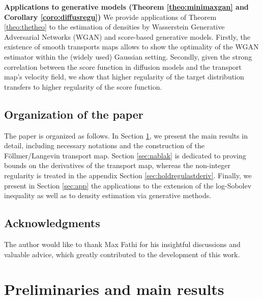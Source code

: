\documentclass{article}
\begin{document}
{\small\textbf{Applications to generative models (Theorem \ref{theo:minimaxgan} and Corollary \ref{coro:diffusregu})}} We provide applications of Theorem \ref{theo:thetheo} to the estimation of densities by Wasserstein Generative Adversarial Networks (WGAN) and score-based generative models. Firstly,  the existence of smooth transports maps allows to show the optimality of the WGAN estimator within the (widely used) Gaussian setting. Secondly, given the strong correlation between the score function in diffusion models and the transport map's velocity field, we show that higher regularity of the target distribution transfers to  higher regularity of the score function. 




\subsection{Organization of the paper}
The paper is organized as follows. In Section \ref{sec:preandmain}, we present the main results in detail, including  necessary notations and the construction of the Föllmer/Langevin transport map. Section \ref{sec:nablak} is dedicated to proving bounds on the derivatives of the transport map, whereas the non-integer regularity is treated in the appendix Section \ref{sec:holdregulastderiv}. Finally, we present in Section \ref{sec:app} the applications to the extension of the log-Sobolev inequality as well as to  density estimation via generative methods.

\subsection*{Acknowledgments}
The author would like to thank Max Fathi for his insightful discussions and valuable advice, which greatly contributed to the development of this work.

\section{Preliminaries and main results}\label{sec:preandmain}
\end{document}
